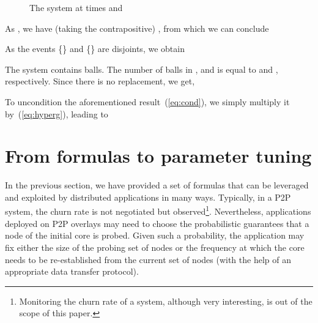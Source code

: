 \documentclass[]{llncs}
\newcommand{\toto}{xxx}
\newenvironment{proofT}{\noindent{\bf
Proof }} {\hspace*{\fill}\par\vspace{3mm}}
\begin{document}
\begin{proofT}
\begin{figure}[h]
\begin{center}
{ }
\end{center}
\caption{The system  at times  and }
\label{fig-proba} 
\vspace{-0.5cm}
\end{figure} 


As ,  we have (taking
the contrapositive) , from which we can
conclude

As the events \{\} and 
 \{\} are disjoints, we obtain

The system contains  balls. The number of balls in ,  and
 is equal to  and , respectively.  
Since there is no replacement, we get, 


	{\small	
}
To uncondition the aforementioned result~(\ref{eq:cond}), we simply multiply it by~(\ref{eq:hyperg}), leading to

 \renewcommand{\toto}{theo-proba-pas-vert}\end{proofT}











\section{From formulas to parameter tuning}
\label{sec:interpretation}

In the  previous section, we  have provided a  set of formulas that  can be
leveraged   and    exploited   by   distributed    applications   in   many
ways. Typically,  in a  P2P system,  the churn rate  is not  negotiated but
observed\footnote{Monitoring the churn  rate of  a system,  although very
interesting, is   out  of  the   scope  of  this   paper.}.  Nevertheless,
applications deployed on P2P overlays  
 may   need  to  choose   the  probabilistic   guarantees  
 that a node of the initial core is probed.
Given such a probability, the application 
may fix  either  the  size of the probing set of  nodes or  the
frequency at  which the core  needs  to be re-established from the current
set of nodes (with the  help  of an appropriate data transfer protocol). 
\end{document}
